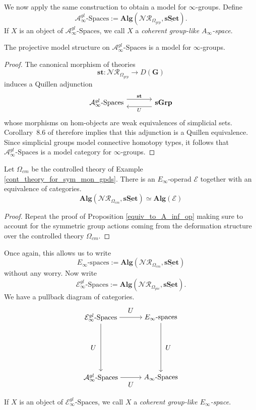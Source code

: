 \documentclass{tac}
\begin{document}
We now apply the same construction to obtain a model for
$\infty$-groups. Define
\[
\mathcal{A}^{gl}_{\infty}\text{-Spaces}
:=
\mathbf{Alg}(\mathcal{NR}_{\Omega_{grp}},\underline{\mathbf{sSet}}).
\]
If $X$ is an object of $\mathcal{A}^{gl}_{\infty}\text{-Spaces}$, we call $X$ a \emph{coherent group-like $A_{\infty}$-space}. 

\begin{theorem}\label{theorem_sixpointtwenty}
The projective model structure on
$\mathcal{A}^{gl}_{\infty}\text{-Spaces}$
is a model for $\infty$-groups.
\end{theorem}

\begin{proof}
The canonical morphism of theories
\[
\mathbf{st}:
\mathcal{NR}_{\Omega_{grp}}
\longrightarrow
D(\mathbf{G})
\]
induces a Quillen adjunction
\[
\begin{tikzcd}[column sep=large]
\mathcal{A}^{gl}_{\infty}\text{-Spaces}
\arrow[r, shift left=1.2ex, "\mathbf{st}"]
&
\mathbf{sGrp}
\arrow[l, shift left=1.2ex, "U"]
\end{tikzcd}
\]
whose morphisms on hom-objects are weak equivalences of simplicial sets.
Corollary~8.6 of \cite{Rezk2002} therefore implies that this adjunction is a
Quillen equivalence. Since simplicial groups model connective homotopy types,
it follows that
$\mathcal{A}^{gl}_{\infty}\text{-Spaces}$
is a model category for $\infty$-groups.
\end{proof}

\begin{proposition}
Let $\Omega_{cm}$ be the controlled theory of Example \ref{cont_theory_for_sym_mon_gpds}. There is an $E_\infty$-operad $\mathcal{E}$ together with an equivalence of categories.
\[
\mathbf{Alg}(\mathcal{NR}_{\Omega_{cm}},\underline{\mathbf{sSet}})\simeq \mathbf{Alg}(\mathcal{E})
\]
\end{proposition}

\begin{proof}
Repeat the proof of Proposition \ref{equiv_to_A_inf_op} making sure to account for the symmetric group actions coming from the deformation structure over the controlled theory $\Omega_{cm}$.
\end{proof}

Once again, this allows us to write 
\[
E_\infty\text{-spaces}:=\mathbf{Alg}(\mathcal{NR}_{\Omega_{cm}},\underline{\mathbf{sSet}})
\]
without any worry. Now write
\[
\mathcal{E}^{gl}_{\infty}\text{-Spaces}:=\mathbf{Alg}(\mathcal{NR}_{\Omega_{pic}},\underline{\mathbf{sSet}}).
\]
We have a pullback diagram of categories.
\[
\begin{tikzpicture}[node distance=3cm]
\node (A) {$\mathcal{E}^{gl}_{\infty}\text{-Spaces}$};
\node (B)[right of=A] {$E_\infty\text{-spaces}$};
\node (C)[below of=A]{$\mathcal{A}^{gl}_{\infty}\text{-Spaces}$};
\node (D)[right of=C]{$A_\infty\text{-Spaces}$};
\draw[->] (A) to node[above=3] {$U$} (B);
\draw[->] (A) to node[left=3] {$U$} (C);
\draw[->] (B) to node[right=3] {$U$} (D);
\draw[->] (C) to node[below=3] {$U$} (D);
\end{tikzpicture}
\]
 If $X$ is an object of $\mathcal{E}^{gl}_{\infty}\text{-Spaces}$, we call $X$ a \emph{coherent group-like $E_\infty$-space}.
\end{document}
